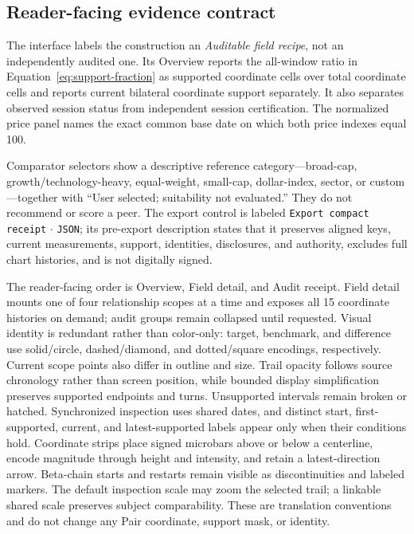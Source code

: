 \documentclass{article}
\begin{document}
\subsection{Reader-facing evidence contract}

The interface labels the construction an \emph{Auditable field recipe}, not an
independently audited one. Its Overview reports the all-window ratio in
Equation~\ref{eq:support-fraction} as supported coordinate cells over total
coordinate cells and reports current bilateral coordinate support separately.
It also separates observed session status from independent session
certification. The normalized price panel names the exact common base date on
which both price indexes equal 100.

Comparator selectors show a descriptive reference category---broad-cap,
growth/technology-heavy, equal-weight, small-cap, dollar-index, sector, or
custom---together with ``User selected; suitability not evaluated.'' They do
not recommend or score a peer. The export control is labeled
\texttt{Export compact receipt} $\cdot$ \texttt{JSON}; its pre-export
description states that it preserves aligned keys, current measurements,
support, identities, disclosures, and authority, excludes full chart
histories, and is not digitally signed.

The reader-facing order is Overview, Field detail, and Audit receipt. Field
detail mounts one of four relationship scopes at a time and exposes all 15
coordinate histories on demand; audit groups remain collapsed until requested.
Visual identity is redundant rather than color-only: target, benchmark, and
difference use solid/circle, dashed/diamond, and dotted/square encodings,
respectively. Current scope points also differ in outline and size. Trail
opacity follows source chronology rather than screen position, while bounded
display simplification preserves supported endpoints and turns. Unsupported
intervals remain broken or hatched. Synchronized inspection uses shared dates,
and distinct start, first-supported, current, and latest-supported labels appear
only when their conditions hold. Coordinate strips place signed microbars above
or below a centerline, encode magnitude through height and intensity, and
retain a latest-direction arrow. Beta-chain starts and restarts remain visible
as discontinuities and labeled markers. The default inspection scale may zoom
the selected trail; a linkable shared scale preserves subject comparability.
These are translation conventions and do not change any Pair coordinate,
support mask, or identity.
\end{document}
